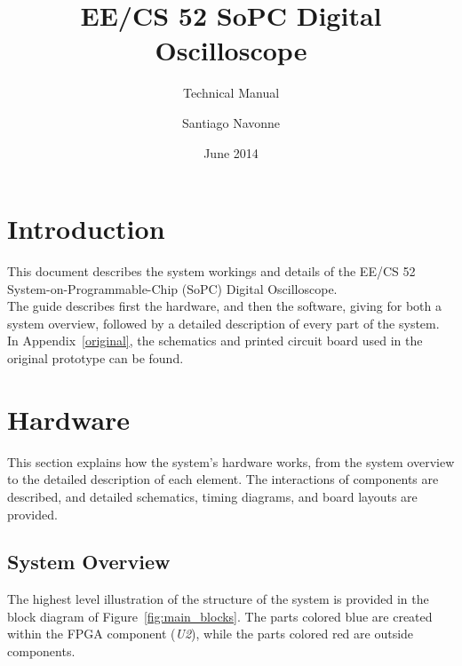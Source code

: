 \documentclass[titlepage]{scrartcl}
\begin{document}
\pagestyle{plain}

\setlength{\footskip}{\footskip+1cm}

	\title{EE/CS 52 SoPC Digital Oscilloscope}
	\subtitle{Technical Manual}
	\author{Santiago Navonne} 
	\date{June 2014} 
	\maketitle
	

	\tableofcontents
	\clearpage


	\section{Introduction}
	This document describes the system workings and details of the EE/CS 52 System-on-Programmable-Chip (SoPC) Digital Oscilloscope.\\

	The guide describes first the hardware, and then the software, giving for both a system overview, followed by a detailed description of every part of the system. In Appendix~\ref{original}, the schematics and printed circuit board used in the original prototype can be found.


	\section{Hardware}
	This section explains how the system's hardware works, from the system overview to the detailed description of each element. The interactions of components are described, and detailed schematics, timing diagrams, and board layouts are provided.
	
	\subsection{System Overview \label{sec:overview}}
	The highest level illustration of the structure of the system is provided in the block diagram of Figure~\ref{fig:main_blocks}. The parts colored blue are created within the FPGA component (\textit{U2}), while the parts colored red are outside components.\\
\end{document}
